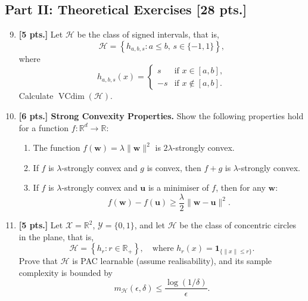 \documentclass[11pt,a4paper]{article}
\DeclareMathOperator{\VCdim}{VCdim}
\begin{document}
\subsection*{Part II: Theoretical Exercises [28 pts.]}

\begin{enumerate}[label=\textbf{\arabic*.}]\setcounter{enumii}{8}
    \item \textbf{[5 pts.]} Let $\mathcal{H}$ be the class of signed intervals, that is,
    \[
    \mathcal{H} = \left\{ h_{a, b, s} : a \le b, \, s \in \{-1, 1\} \right\},
    \]
    where
    \[
    h_{a, b, s}(x) = \begin{cases} s & \text{if } x \in [a, b], \\ -s & \text{if } x \notin [a, b]. \end{cases}
    \]
    Calculate $\VCdim(\mathcal{H})$.

    \item \textbf{[6 pts.] Strong Convexity Properties.} Show the following properties hold for a function $f : \mathbb{R}^d \to \mathbb{R}$:
    \begin{enumerate}[label=(\a*)]
        \item The function $f(\mathbf{w}) = \lambda \|\mathbf{w}\|^2$ is $2\lambda$-strongly convex.
        \item If $f$ is $\lambda$-strongly convex and $g$ is convex, then $f + g$ is $\lambda$-strongly convex.
        \item If $f$ is $\lambda$-strongly convex and $\mathbf{u}$ is a minimiser of $f$, then for any $\mathbf{w}$:
        \[
        f(\mathbf{w}) - f(\mathbf{u}) \ge \frac{\lambda}{2} \|\mathbf{w} - \mathbf{u}\|^2.
        \]
    \end{enumerate}

    \item \textbf{[5 pts.]} Let $\mathcal{X} = \mathbb{R}^2$, $\mathcal{Y} = \{0, 1\}$, and let $\mathcal{H}$ be the class of concentric circles in the plane, that is,
    \[
    \mathcal{H} = \left\{ h_r : r \in \mathbb{R}_+ \right\}, \quad \text{where } h_r(x) = \mathbf{1}_{\{\|x\| \le r\}}.
    \]
    Prove that $\mathcal{H}$ is PAC learnable (assume realisability), and its sample complexity is bounded by
    \[
    m_{\mathcal{H}}(\epsilon, \delta) \le \frac{\log(1 / \delta)}{\epsilon}.
    \]


\end{enumerate}
\end{document}
